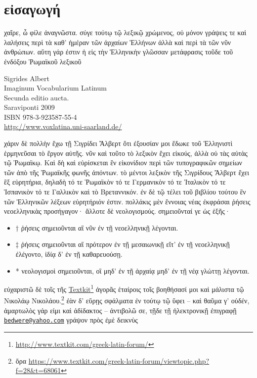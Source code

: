 \documentclass{book}
\begin{document}
\section*{εἰσαγωγή}
χαῖρε, ὦ φίλε ἀναγνῶστα. σύγε τούτῳ τῷ λεξικῷ χρώμενος, οὐ μόνον γράψεις τε καὶ
λαλήσεις περὶ τὰ καθ' ἡμέραν τῶν  ἀρχαίων Ἑλλήνων ἀλλὰ καὶ περὶ τὰ τῶν νῦν ἀνθρώπων. 
αὕτη γάρ ἐστιν ἡ εἰς τὴν Ἑλληνικὴν γλῶσσαν μετάφρασις τοῦδε τοῦ ἐνδόξου Ῥωμαϊκοῦ λεξικοῦ 
\begin{flushleft}
Sigrides Albert  \\
Imaginum Vocabularium Latinum  \\
Secunda editio aucta. \\
Saraviponti 2009 \\
ISBN 978-3-923587-55-4 \\
\url{http://www.voxlatina.uni-saarland.de/}
\end{flushleft}
χάριν δὲ πολλὴν ἔχω τῇ Σιγρίδει Ἄλβερτ ὅτι ἐξουσίαν  μοι ἔδωκε τοῦ Ἑλληνιστὶ
ἑρμηνεῦσαι τὸ ἔργον αὐτῆς. 
νῦν καὶ τοῦτο τὸ λεξικὸν ἔχει εἰκούς, ἀλλὰ οὐ τὰς αὐτὰς τῷ Ῥωμαϊκῳ. Καὶ δὴ καὶ εὑρίσκεται ἓν εἰκονίδιον περὶ τῶν
τυπογραφικῶν σημείων τῶν ἀπὸ τῆς Ῥωμαϊκῆς φωνῆς ἀπόντων.
τὸ μέντοι λεξικὸν τῆς Σιγρίδους Ἄλβερτ ἔχει ἓξ εὑρητήρια, δηλαδὴ 
 τό τε Ῥωμαϊκὸν τό τε Γερμανικὸν τό τε
Ἰταλικὸν τό τε Ἱσπανικὸν τό τε Γαλλικὸν καὶ τὸ Βρεταννικόν.
 ἐν δὲ τῷ τέλει τοῦ βιβλίου τούτου ἓν 
τῶν Ἑλληνικῶν λέξεων
εὑρητήριόν ἐστιν.  
πολλάκις μὲν ἔννοιας νέας ἐκφράσαι ῥήσεις νεοελληνικὰς προσήγαγον· ἄλλοτε δὲ νεολογισμούς. σημειοῦνταί γε ὡς ἑξῆς·
\begin{itemize}
\item † ῥήσεις σημειοῦνται αἳ νῦν ἐν τῇ νεοελληνικῇ λέγονται.
\item ‡ ῥήσεις σημειοῦνται αἳ πρότερον ἐν τῇ μεσαιωνικῇ εἴτ' ἐν τῇ νεοελληνικῇ ἐλέγοντο, ἰδίᾳ δ' ἐν τῇ καθαρευούσῃ.
\item * νεολογισμοὶ σημειοῦνται, οἳ μηδ' ἐν τῇ ἀρχαίᾳ μηδ' ἐν τῇ νέᾳ γλώττῃ λέγονται.
\end{itemize}
εὐχαριστῶ δὲ τοῖς  τῆς
\href{http://www.textkit.com/greek-latin-forum/}{Textkit}\footnote{\url{http://www.textkit.com/greek-latin-forum/}} ἀγορᾶς
ἑταίροις τοῖς βοηθήσασί μοι καὶ μάλιστα τῷ  Νικολάῳ Νικολάου.\footnote{ὅρα \url{https://www.textkit.com/greek-latin-forum/viewtopic.php?f=28&t=68061}} ἐὰν δ' εὕρῃς 
σφάλματα
ἐν τούτῳ τῷ ὕφει -- καὶ θαῦμα γ' οὐδέν, ἁμαρτωλὸς γάρ εἰμι καὶ ἀδίδακτος --
  ἀντιβολῶ σε, τῇδε τῇ ἠλεκτρονικῇ ἐπιγραφῇ  
\href{mailto:bedwere@yahoo.com}{\texttt{bedwere@yahoo.com}}
γράψον πρὸς ἐμὲ δεικνὺς 
\end{document}
